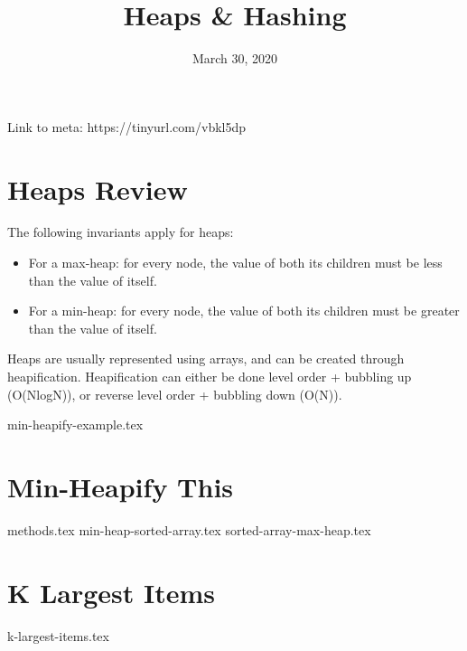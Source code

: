 \documentclass[11pt]{exam}
\title{Heaps \& Hashing}
\date{March 30, 2020}
\begin{document}
\maketitle
\begin{solution}
Link to meta: https://tinyurl.com/vbkl5dp
\end{solution}

\section{Heaps Review}
The following invariants apply for heaps: 
\begin{itemize}
  \item For a max-heap: for every node, the value of both its children must be less than the value of itself. 
  \item For a min-heap: for every node, the value of both its children must be greater than the value of itself. 
\end{itemize}
Heaps are usually represented using arrays, and can be created through heapification. Heapification can either be done level order + bubbling up (O(NlogN)), or reverse level order + bubbling down (O(N)). 
\begin{questions}
{min-heapify-example.tex}
\end{questions}

\section{Min-Heapify This}
\begin{questions}
{methods.tex}
{min-heap-sorted-array.tex}
{sorted-array-max-heap.tex}
\end{questions}

\section{K Largest Items}
\begin{questions}
{k-largest-items.tex}
\end{questions}
\end{document}
